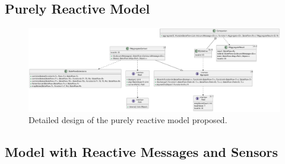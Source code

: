 \subsection{Purely Reactive Model}

\begin{figure}
    \centering
    \includegraphics[width=\linewidth]{figures/collektive-prm-design.pdf}
    \caption{Detailed design of the purely reactive model proposed.}
    \label{fig:collektive-prm-design}
\end{figure}

\subsection{Model with Reactive Messages and Sensors}